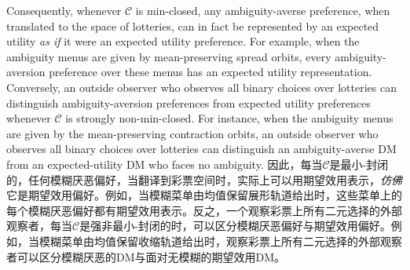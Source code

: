\documentclass[12pt,letterpaper]{article}
\newenvironment{original}{\color{black}}{}
\newenvironment{translation}{\color{blue}}{}
\theoremstyle{plain}
\theoremstyle{definition}
\theoremstyle{remark}
\newcommand{\C}{\mathcal{C}}
\theoremstyle{definition}
\begin{document}
\begin{original}
Consequently, whenever $\C$ is min-closed, any ambiguity-averse preference, when translated to the space of lotteries, can in fact be represented by an expected utility \emph{as if} it were an expected utility preference. For example, when the ambiguity menus are given by mean-preserving spread orbits, every ambiguity-aversion preference over these menus has an expected utility representation. Conversely, an outside observer who observes all binary choices over lotteries can distinguish ambiguity-aversion preferences from expected utility preferences whenever $\C$ is strongly non-min-closed. For instance, when the ambiguity menus are given by the mean-preserving contraction orbits, an outside observer who observes all binary choices over lotteries can distinguish an ambiguity-averse DM from an expected-utility DM who faces no ambiguity.
\end{original}
\begin{translation}
因此，每当$\C$是最小-封闭的，任何模糊厌恶偏好，当翻译到彩票空间时，实际上可以用期望效用表示，\textit{仿佛}它是期望效用偏好。例如，当模糊菜单由均值保留展形轨道给出时，这些菜单上的每个模糊厌恶偏好都有期望效用表示。反之，一个观察彩票上所有二元选择的外部观察者，每当$\C$是强非最小-封闭的时，可以区分模糊厌恶偏好与期望效用偏好。例如，当模糊菜单由均值保留收缩轨道给出时，观察彩票上所有二元选择的外部观察者可以区分模糊厌恶的DM与面对无模糊的期望效用DM。
\end{translation}
\end{document}
